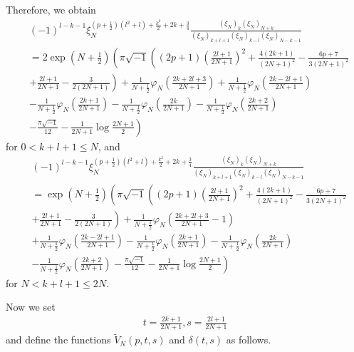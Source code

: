 \documentclass[12pt]{amsart}
\begin{document}
Therefore, we obtain 
\begin{align}
    &(-1)^{l-k-1}\xi_N^{(p+\frac{1}{2})(l^2+l)+\frac{k^2}{2}+2k+\frac{3}{4}}\frac{(\xi_N)_k(\xi_N)_{N+k}}{(\xi_N)_{k+l+1}(\xi_N)_{k-l}(\xi_N)_{N-k-1}}\\\nonumber
    &=2\exp (N+\frac{1}{2})\left(\pi \sqrt{-1}\left((2p+1)\left(\frac{2l+1}{2N+1}\right)^2+\frac{4(2k+1)}{(2N+1)^2}-\frac{6p+7}{3(2N+1)^2}\right.\right.\\\nonumber&\left.\left.+\frac{2l+1}{2N+1}-\frac{3}{2(2N+1)}\right)+\frac{1}{N+\frac{1}{2}}\varphi_N\left(\frac{2k+2l+3}{2N+1}\right)+\frac{1}{N+\frac{1}{2}}\varphi_N\left(\frac{2k-2l+1}{2N+1}\right)\right.\\\nonumber
    &\left.-\frac{1}{N+\frac{1}{2}}\varphi_N\left(\frac{2k+1}{2N+1}\right)-\frac{1}{N+\frac{1}{2}}\varphi_N\left(\frac{2k}{2N+1}\right)-\frac{1}{N+\frac{1}{2}}\varphi_N\left(\frac{2k+2}{2N+1}\right)\right.\\\nonumber
    &\left.-\frac{\pi\sqrt{-1}}{12 }-\frac{1}{2N+1}\log \frac{2N+1}{2} \right)
\end{align}
for $0<k+l+1\leq N$, and
\begin{align}
    &(-1)^{l-k-1}\xi_N^{(p+\frac{1}{2})(l^2+l)+\frac{k^2}{2}+2k+\frac{3}{4}}\frac{(\xi_N)_k(\xi_N)_{N+k}}{(\xi_N)_{k+l+1}(\xi_N)_{k-l}(\xi_N)_{N-k-1}}\\\nonumber
    &=\exp (N+\frac{1}{2})\left(\pi \sqrt{-1}\left((2p+1)\left(\frac{2l+1}{2N+1}\right)^2+\frac{4(2k+1)}{(2N+1)^2}-\frac{6p+7}{3(2N+1)^2}\right.\right.\\\nonumber&\left.\left.+\frac{2l+1}{2N+1}-\frac{3}{2(2N+1)}\right)+\frac{1}{N+\frac{1}{2}}\varphi_N\left(\frac{2k+2l+3}{2N+1}-1\right)\right.\\\nonumber
    &\left.+\frac{1}{N+\frac{1}{2}}\varphi_N\left(\frac{2k-2l+1}{2N+1}\right)-\frac{1}{N+\frac{1}{2}}\varphi_N\left(\frac{2k+1}{2N+1}\right)-\frac{1}{N+\frac{1}{2}}\varphi_N\left(\frac{2k}{2N+1}\right)\right.\\\nonumber
    &\left.-\frac{1}{N+\frac{1}{2}}\varphi_N\left(\frac{2k+2}{2N+1}\right)-\frac{\pi\sqrt{-1}}{12 }-\frac{1}{2N+1}\log \frac{2N+1}{2} \right)
\end{align}
for $N<k+l+1\leq 2N$. 

Now we set
\begin{align}
    t=\frac{2k+1}{2N+1}, s=\frac{2l+1}{2N+1}
\end{align}
and define the functions $\tilde{V}_N(p,t,s)$ and $\delta(t,s)$ as follows. 
\end{document}
